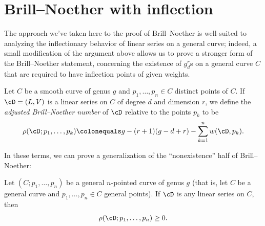 \section{Brill--Noether with inflection}

The approach we've taken here to the proof of Brill--Noether is
%
%
%
well-suited to analyzing the inflectionary behavior of linear series on a
general curve; indeed, a small modification of the argument above allows
us to prove a stronger form of the Brill--Noether statement, concerning
the existence of $g^r_d$s on a general curve $C$ that are required to
 have inflection points of given weights.

\begin{definition}
Let $C$ be a smooth curve of genus $g$ and $p_1,\dots,p_n \in C$ distinct
points of $C$. If $\cD = (L,V)$ is a linear series on $C$ of degree $d$
and dimension $r$, we define the \emph{adjusted Brill--Noether number}
%
of $\cD$ relative to the points $p_k$ to be
$$
\rho(\cD; p_1,\dots,p_k) \colonequals  g - (r+1)(g-d+r) - \sum_{k=1}^n
w(\cD,p_k).
$$
\end{definition}

In these terms, we can prove
a
generalization of the
``nonexistence'' half of Brill--Noether:

\begin{theorem}\label{Brill--Noether with inflection}
Let $(C;p_1,\dots,p_n)$ be a general $n$-pointed curve of genus $g$
%
%
(that is, let $C$ be a general curve and $p_1,\dots,p_n \in C$ general
points). If $\cD$ is any linear series on $C$, then
$$
\rho(\cD; p_1,\dots,p_n) \geq 0.
$$
\end{theorem}

